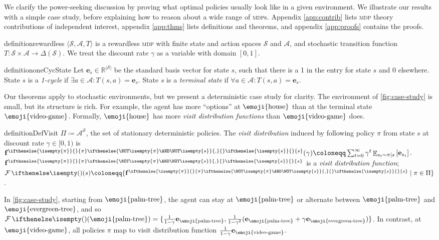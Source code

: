 \documentclass{article}
\renewcommand{\abs}[1]{\left|#1\right|}
\newcommand*{\brx}[1]{\left[#1\right]}
\newcommand*{\defeq}{\coloneqq} %
\newcommand*{\reals}{\mathbb{R}}
\newcommand*{\unitvec}[1][s]{\mathbf{e}_{#1}}
\newcommand*{\mdp}[1][m]{{\textsc{#1dp}}}
\newcommand*{\St}{\mathcal{S}}
\newcommand*{\A}{\mathcal{A}}
\newcommand{\stateEnd}{1-cycle}
\newcommand*{\terminal}{terminal}
\DeclareMathOperator*{\opE}{\mathbb{E}}
\newcommand*{\E}[2]{\opE_{#1}\brx{#2}} %
\newcommand*{\f}{\mathbf{f}} %
\newcommand*{\fpi}[2][\pi]{\f^{
\ifthenelse{\isempty{#1}}{}{#1} %
\ifthenelse{\NOT\isempty{#1} \AND \NOT\isempty{#2}}{,}{} %
\ifthenelse{\isempty{#2}}{}{#2}}} %
\newcommand*{\geom}[1][1]{\frac{#1}{1-\gamma}}
\theoremstyle{definition}
\newcommand*{\start}{\text{\emoji{house}}}
\newcommand*{\sink}{\text{\emoji{video-game}}}
\newcommand*{\topleft}{\text{\emoji{evergreen-tree}}}
\newcommand*{\farleft}{\text{\emoji{palm-tree}}}
\newcommand*{\start}{\star}
\newcommand*{\sink}{\varnothing}
\newcommand*{\topleft}{\ell_{\nwarrow}}
\newcommand*{\farleft}{\ell_{\swarrow}}
\begin{document}
We clarify the power-seeking discussion by proving what optimal policies usually look like in a given environment. We illustrate our results with a simple case study, before explaining how to reason about a wide range of {\mdp}s. Appendix \ref{app:contrib} lists  {\mdp} theory contributions  of independent interest, appendix \ref{app:thms} lists definitions and theorems, and appendix \ref{app:proofs} contains the proofs.

\begin{restatable}[Rewardless {\mdp}]{definition}{rewardless}
$\langle \mathcal{S}, \mathcal{A}, T \rangle$ is a rewardless {\mdp} with finite state and action spaces $\mathcal{S}$ and $\mathcal{A}$, and stochastic transition function $T: \St \times \A \to \Delta(\St)$. We treat the discount rate $\gamma$ as a variable with domain $[0,1]$.
\end{restatable} 

\begin{restatable}[{\stateEnd} states]{definition}{oneCycState}\label{def:onecyc}
Let $\unitvec[s]\in \reals^{\abs{\St}}$ be the standard basis vector for state $s$, such that there is a 1 in the entry for state $s$ and 0 elsewhere. State $s$ is a \emph{\stateEnd} if $\exists a\in\A: T(s,a)=\unitvec$. State $s$ is a \emph{{\terminal} state} if $\forall a\in\A:T(s,a)=\unitvec$.
\end{restatable}

Our theorems apply to stochastic environments, but we present a deterministic case study for clarity. The environment of \cref{fig:case-study} is small, but its structure is rich. For example, the agent has more ``options'' at $\start$  than at the terminal state $\sink$. Formally, $\start$ has more \emph{visit distribution functions} than $\sink$ does. 

\begin{restatable}{definition}{DefVisit}\label{def:visit}
$\Pi\defeq \A^\St$, the set of stationary deterministic policies. The \emph{visit distribution} induced by following policy $\pi$ from state $s$ at discount rate $\gamma\in[0,1)$ is $\fpi{s}(\gamma) \defeq \sum_{t=0}^\infty \gamma^t \E{s_{t} \sim \pi\mid s}{\unitvec[s_t]}$.
$\fpi{s}$ is a \emph{visit distribution function}; $\F(s)\defeq \{ \fpi{s} \mid \pi \in \Pi\}$. 
\end{restatable}

In \cref{fig:case-study}, starting from $\farleft$, the agent can stay at $\farleft$ or alternate between $\farleft$ and $\topleft$, and so $\F(\farleft)= \{\geom\unitvec[\farleft],\frac{1}{1-\gamma^2}(\unitvec[\farleft] + \gamma\unitvec[\topleft])\}$. In contrast, at $\sink$, all policies $\pi$ map to visit distribution function $\geom\unitvec[\sink]$.
\end{document}
